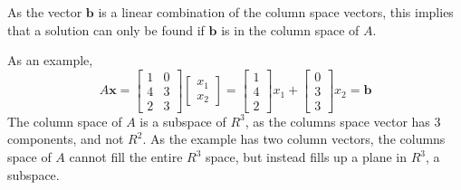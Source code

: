             \par \hfill \break
            As the vector \(\boldsymbol{b}\) is a linear combination of the column space vectors, this implies that a 
            solution can only be found if \(\boldsymbol{b}\) is in the column space of \(A\).

            \par \hfill \break
            As an example,
            \begin{equation}
                A\boldsymbol{x} =
                \begin{bmatrix}
                    1 & 0 \\
                    4 & 3 \\
                    2 & 3
                \end{bmatrix}
                \begin{bmatrix}
                    x_1 \\ 
                    x_2 
                \end{bmatrix}
                = 
                \begin{bmatrix}
                    1 \\
                    4 \\
                    2
                \end{bmatrix}
                x_1 +
                \begin{bmatrix}
                    0 \\
                    3 \\
                    3
                \end{bmatrix}
                x_2 =
                \boldsymbol{b}
            \end{equation}
            The column space of \(A\) is a subspace of \(R^3\), as the columns space vector has 3 components, and not 
            \(R^2\). As the example has two column vectors, the columns space of \(A\) cannot fill the entire \(R^3\) 
            space, but instead fills up a plane in \(R^3\), a subspace.

